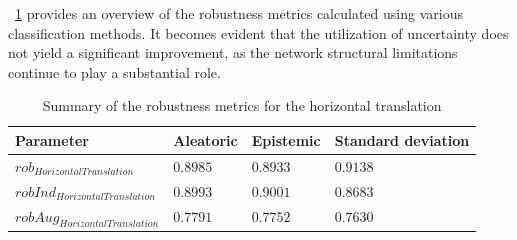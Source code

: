 \Tab~\ref{table:rob_ht} provides an overview of the robustness metrics calculated using various classification methods. It becomes evident that the utilization of uncertainty does not yield a significant improvement, as the network structural limitations continue to play a substantial role.

\begin{table}[h]
	\centering
	\begin{tabular}{|| l | l | l | l ||} 
		\hline
		\textbf{Parameter} & \textbf{Aleatoric} & \textbf{Epistemic} & \textbf{Standard deviation} \\
		\hline
		\hline
		$rob_{HorizontalTranslation}$ & $0.8985$ & $0.8933$ & $0.9138$ \\
		$robInd_{HorizontalTranslation}$ & $0.8993$ & $0.9001$ & $0.8683$ \\
		$robAug_{HorizontalTranslation}$ & $0.7791$ & $0.7752$ & $0.7630$ \\	
		\hline
	\end{tabular}	
	\caption{Summary of the robustness metrics for the horizontal translation}
	\label{table:rob_ht}
\end{table}